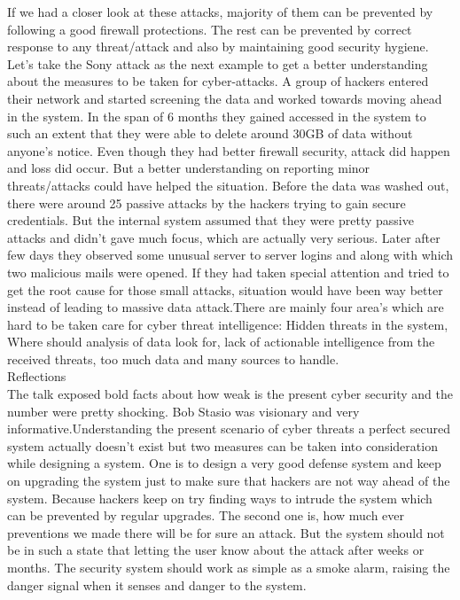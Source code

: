 \documentclass{article}
\begin{document}
If we had a closer look at these attacks, majority of them can be prevented by following a good firewall protections. The rest can be prevented by correct response to any threat/attack and also by maintaining good security hygiene.
Let’s take the Sony attack as the next example to get a better understanding about the measures to be taken for cyber-attacks. A group of hackers entered their network and started screening the data and worked towards moving ahead in the system. In the span of 6 months they gained accessed in the system to such an extent that they were able to delete around 30GB of data without anyone's notice. Even though they had better firewall security, attack did happen and loss did occur. But a better understanding on reporting minor threats/attacks could have helped the situation. Before the data was washed out, there were around 25 passive attacks by the hackers trying to gain secure credentials. But the internal system assumed that they were pretty passive attacks and didn’t gave much focus, which are actually very serious. Later after few days they observed some unusual server to server logins and along with which two malicious mails were opened. If they had taken special attention and tried to get the root cause for those small attacks, situation would have been way better instead of leading to massive data attack.There are mainly four area’s which are hard to be taken care for cyber threat intelligence: Hidden threats in the system, Where should analysis of data look for, lack of actionable intelligence from the received threats, too much data and many sources to handle.\\

                                                                                       Reflections\\
                                                               
The talk exposed bold facts about how weak is the present cyber security and the number were pretty shocking. Bob Stasio was visionary and very informative.Understanding the present scenario of cyber threats 
a perfect secured system actually doesn’t exist but two measures can be taken into consideration while designing a system. One is to design a very good defense system and keep on upgrading the system just to make sure that hackers are not way ahead of the system. Because hackers keep on try finding ways to intrude the system which can be prevented by regular upgrades.
The second one is, how much ever preventions we made there will be for sure an attack. But the system should not be in such a state that letting the user know about the attack after weeks or months. The security system should work as simple as a smoke alarm, raising the danger signal when it senses and danger to the system.
\end{document}

